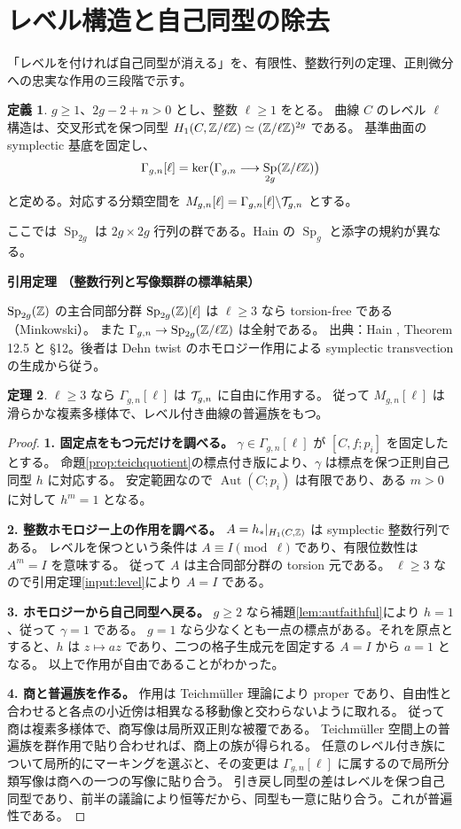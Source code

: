 \documentclass[dvipdfmx,a4paper,11pt]{article}
\theoremstyle{definition}
\newtheorem{thm}{定理}[section]
\newtheorem{dfn}[thm]{定義}
\newenvironment{aim}{\begin{tcolorbox}[mybox,colback=green!3,title=この章で考えること,fonttitle=\bfseries]}{\end{tcolorbox}}
\DeclareMathOperator{\Aut}{Aut}\DeclareMathOperator{\Pic}{Pic}\DeclareMathOperator{\Hom}{Hom}
\DeclareMathOperator{\Sp}{Sp}\DeclareMathOperator{\Sym}{Sym}\DeclareMathOperator{\Ext}{Ext}
\newenvironment{external}[1]{\Needspace{7\baselineskip}\refstepcounter{thm}\begin{tcolorbox}[mybox,colback=blue!2,colframe=blue!40!black]\textbf{引用定理 \thethm（#1）}\par}{\end{tcolorbox}}
\begin{document}
\section{レベル構造と自己同型の除去}\label{sec:level}
\begin{aim}
「レベルを付ければ自己同型が消える」を、有限性、整数行列の定理、正則微分への忠実な作用の三段階で示す。
\end{aim}
\begin{dfn}
$g\ge1$、$2g-2+n>0$ とし、整数 $\ell\ge1$ をとる。
曲線 $C$ のレベル $\ell$ 構造は、交叉形式を保つ同型
$H_1(C,\mathbb Z/\ell\mathbb Z)\simeq(\mathbb Z/\ell\mathbb Z)^{2g}$ である。
基準曲面の symplectic 基底を固定し、
\[
\Gamma_{g,n}[\ell]=\ker\bigl(\Gamma_{g,n}\longrightarrow
\Sp_{2g}(\Z/\ell\Z)\bigr)
\]
と定める。対応する分類空間を $M_{g,n}[\ell]=\Gamma_{g,n}[\ell]\backslash\mathcal T_{g,n}$ とする。
\end{dfn}
ここでは $\Sp_{2g}$ は $2g\times2g$ 行列の群である。Hain の $\Sp_g$ と添字の規約が異なる。
\begin{external}{整数行列と写像類群の標準結果}\label{input:level}
$\Sp_{2g}(\Z)$ の主合同部分群 $\Sp_{2g}(\Z)[\ell]$ は $\ell\ge3$ なら torsion-free である（Minkowski）。
また $\Gamma_{g,n}\to\Sp_{2g}(\Z/\ell\Z)$ は全射である。
出典：Hain \cite{Hain}, Theorem 12.5 と \S12。後者は Dehn twist のホモロジー作用による symplectic transvection の生成から従う。
\end{external}
\begin{thm}\label{thm:levelfree}
$\ell\ge3$ なら $\Gamma_{g,n}[\ell]$ は $\mathcal T_{g,n}$ に自由に作用する。
従って $M_{g,n}[\ell]$ は滑らかな複素多様体で、レベル付き曲線の普遍族をもつ。
\end{thm}
\begin{proof}
\textbf{1. 固定点をもつ元だけを調べる。}
$\gamma\in\Gamma_{g,n}[\ell]$ が $[C,f;p_i]$ を固定したとする。
命題\ref{prop:teichquotient}の標点付き版により、$\gamma$ は標点を保つ正則自己同型 $h$ に対応する。
安定範囲なので $\Aut(C;p_i)$ は有限であり、ある $m>0$ に対して $h^m=1$ となる。

\textbf{2. 整数ホモロジー上の作用を調べる。}
$A=h_*|_{H_1(C,\mathbb Z)}$ は symplectic 整数行列である。
レベルを保つという条件は $A\equiv I\pmod\ell$ であり、有限位数性は $A^m=I$ を意味する。
従って $A$ は主合同部分群の torsion 元である。
$\ell\ge3$ なので引用定理\ref{input:level}により $A=I$ である。

\textbf{3. ホモロジーから自己同型へ戻る。}
$g\ge2$ なら補題\ref{lem:autfaithful}により $h=1$、従って $\gamma=1$ である。
$g=1$ なら少なくとも一点の標点がある。それを原点とすると、$h$ は $z\mapsto az$ であり、二つの格子生成元を固定する $A=I$ から $a=1$ となる。
以上で作用が自由であることがわかった。

\textbf{4. 商と普遍族を作る。}
作用は Teichmüller 理論により proper であり、自由性と合わせると各点の小近傍は相異なる移動像と交わらないように取れる。
従って商は複素多様体で、商写像は局所双正則な被覆である。
Teichmüller 空間上の普遍族を群作用で貼り合わせれば、商上の族が得られる。
任意のレベル付き族について局所的にマーキングを選ぶと、その変更は $\Gamma_{g,n}[\ell]$ に属するので局所分類写像は商への一つの写像に貼り合う。
引き戻し同型の差はレベルを保つ自己同型であり、前半の議論により恒等だから、同型も一意に貼り合う。これが普遍性である。
\end{proof}
\end{document}
